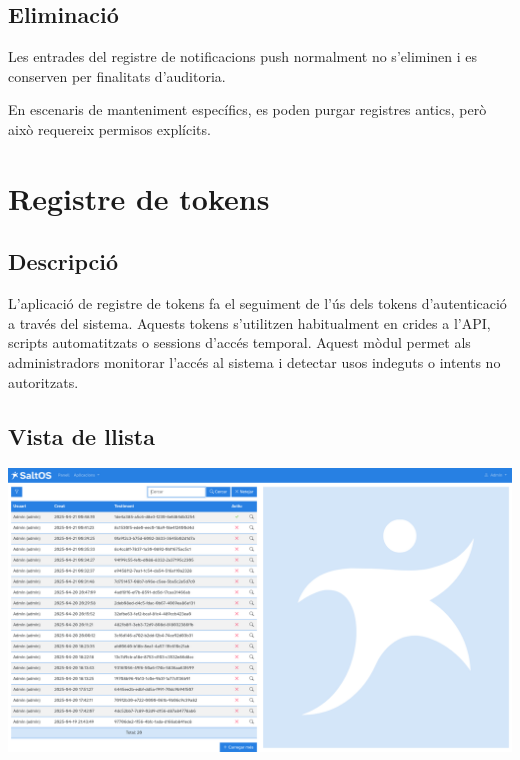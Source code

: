 \documentclass[a4paper]{article}
\begin{document}
\hypertarget{toc25}{}
\subsection{Eliminació}

Les entrades del registre de notificacions push normalment no s'eliminen i es conserven per finalitats d'auditoria.

En escenaris de manteniment específics, es poden purgar registres antics, però això requereix permisos explícits.


\hypertarget{toc26}{}
\section{Registre de tokens}

\hypertarget{toc27}{}
\subsection{Descripció}

L'aplicació de registre de tokens fa el seguiment de l'ús dels tokens d'autenticació a través del sistema.
Aquests tokens s'utilitzen habitualment en crides a l'API, scripts automatitzats o sessions d'accés temporal.
Aquest mòdul permet als administradors monitorar l'accés al sistema i detectar usos indeguts o intents no autoritzats.

\hypertarget{toc28}{}
\subsection{Vista de llista}

\begin{center}\includegraphics[width=1\textwidth]{../ujest/snaps/test-screenshots-js-screenshots-common-tokenslog-list-ca-es-1-snap.png}\end{center}
\end{document}
